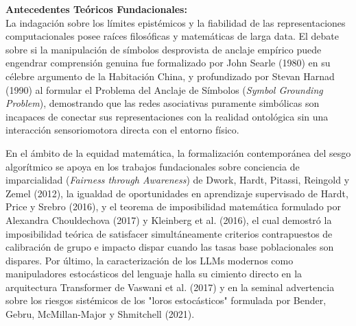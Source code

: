 \textbf{Antecedentes Teóricos Fundacionales:}\\[0.2cm]
La indagación sobre los límites epistémicos y la fiabilidad de las representaciones computacionales posee raíces filosóficas y matemáticas de larga data. El debate sobre si la manipulación de símbolos desprovista de anclaje empírico puede engendrar comprensión genuina fue formalizado por John Searle (1980) en su célebre argumento de la Habitación China, y profundizado por Stevan Harnad (1990) al formular el Problema del Anclaje de Símbolos (\textit{Symbol Grounding Problem}), demostrando que las redes asociativas puramente simbólicas son incapaces de conectar sus representaciones con la realidad ontológica sin una interacción sensoriomotora directa con el entorno físico.

En el ámbito de la equidad matemática, la formalización contemporánea del sesgo algorítmico se apoya en los trabajos fundacionales sobre conciencia de imparcialidad (\textit{Fairness through Awareness}) de Dwork, Hardt, Pitassi, Reingold y Zemel (2012), la igualdad de oportunidades en aprendizaje supervisado de Hardt, Price y Srebro (2016), y el teorema de imposibilidad matemática formulado por Alexandra Chouldechova (2017) y Kleinberg et al. (2016), el cual demostró la imposibilidad teórica de satisfacer simultáneamente criterios contrapuestos de calibración de grupo e impacto dispar cuando las tasas base poblacionales son dispares. Por último, la caracterización de los LLMs modernos como manipuladores estocásticos del lenguaje halla su cimiento directo en la arquitectura Transformer de Vaswani et al. (2017) y en la seminal advertencia sobre los riesgos sistémicos de los "loros estocásticos" formulada por Bender, Gebru, McMillan-Major y Shmitchell (2021).\\[0.4cm]

